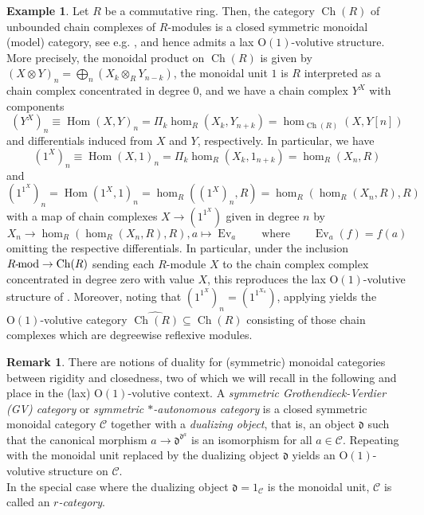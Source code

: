 \documentclass{article}
\newcommand{\Hom}{\operatorname{Hom}}%
\newcommand{\Cha}{\operatorname{Ch}}%
\newcommand{\Rmod}{R\text{-}\hspace{-0.1cm}\operatorname{mod}}%
\newcommand{\Ev}{\operatorname{Ev}}%
\newcommand{\Oone}{\operatorname{O(1)}}
\newcommand{\C}{\mathcal{C}}
\numberwithin{equation}{section}
\theoremstyle{definition}
\newtheorem{example}[definition]{Example}
\newtheorem{remark}[definition]{Remark}
\theoremstyle{theorem}
\begin{document}
\begin{example}
    Let $R$ be a commutative ring. Then, the category $\Cha(R)$ of unbounded chain complexes of $R$-modules is a closed symmetric monoidal (model) category, 
    see e.g. \cite[Proposition 4.2.13]{hovey2007model}, and hence admits a lax $\Oone$-volutive structure. More precisely, the monoidal product on 
    $\Cha(R)$ is given by $(X \otimes Y)_n = \bigoplus_n (X_k \otimes_R Y_{n-k})$, the monoidal unit $1$ is $R$ interpreted 
    as a chain complex concentrated in degree $0$, and we have a chain complex $Y^X$ with components
    \begin{equation}
        (Y^X)_n \equiv \Hom(X,Y)_n = \Pi_k \hom_{R}(X_k,Y_{n+k}) = \hom_{\Cha(R)}(X,Y[n])
    \end{equation}
    and differentials induced %
    from $X$ and $Y$, respectively. In particular, we have 
    \begin{equation}
        (1^X)_n \equiv \Hom(X,1)_n  = \Pi_k \hom_{R}(X_k,1_{n+k}) = \hom_{R}(X_n,R)
    \end{equation}
    and 
    \begin{equation}
        (1^{1^X})_n = \Hom(1^X,1)_n = \hom_{R}((1^X)_n,R) = \hom_{R}(\hom_{R}(X_n,R),R)
    \end{equation}
    with a map of chain complexes $X \to (1^{1^X})$ given in degree $n$ by 
    \begin{equation}
        X_n \to \hom_{R}(\hom_{R}(X_n,R),R), a \mapsto \Ev_a \qquad \text{where} \qquad \Ev_a(f) = f(a)
    \end{equation}
    omitting the respective differentials. In particular, under the inclusion $\Rmod \to \Cha(R)$ sending each $R$-module $X$ to the chain 
    complex complex concentrated in degree zero with value $X$, this reproduces the lax $\Oone$-volutive structure of 
    . Moreover, noting that $(1^{1^X})_n = (1^{1^{X_n}})$, applying 
     yields the $\Oone$-volutive category 
    $\widehat{\Cha(R)} \subseteq \Cha(R)$ consisting of those chain complexes which are degreewise reflexive modules. 
\end{example}
\begin{remark}
    There are notions of duality for (symmetric) monoidal categories between rigidity and closedness, two of which we will recall in the following and 
    place in the (lax) $\Oone$-volutive context. A \emph{symmetric Grothendieck-Verdier (GV) category} or \emph{symmetric $*$-autonomous category} 
    is a closed symmetric monoidal category $\C$ together with a \emph{dualizing object}, that is, an object $\mathfrak{d}$ such that the canonical morphism 
    $a \to \mathfrak{d}^{\mathfrak{d}^a}$ is an isomorphism for all $a \in \C$. Repeating  
    with the monoidal unit replaced by the dualizing object $\mathfrak{d}$ yields an $\Oone$-volutive structure on $\C$.\\
    In the special case where the dualizing object $\mathfrak{d} = 1_{\C}$ is the monoidal unit, $\C$ is called an \emph{$r$-category}.
\end{remark}
\end{document}
